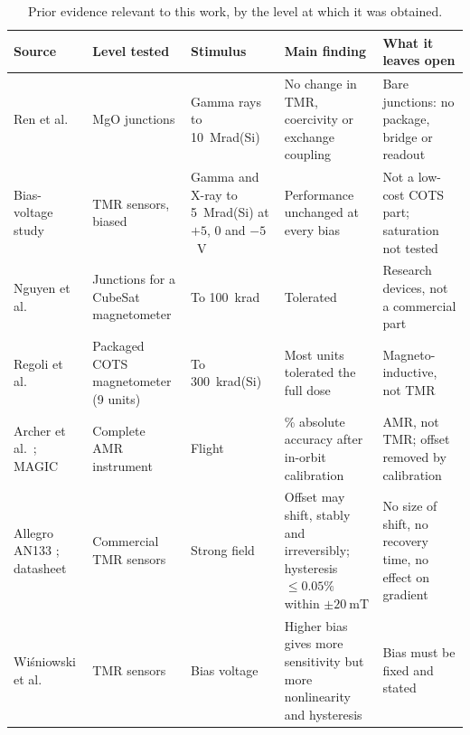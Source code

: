 \documentclass[12pt,a4paper]{article}
\begin{document}
\begin{table}[H]
\centering
\caption{Prior evidence relevant to this work, by the level at which it was obtained.}
\label{tab:lit-synthesis}
\small
\begin{tabular}{@{}>{\raggedright\arraybackslash}p{}>{\raggedright\arraybackslash}p{}>{\raggedright\arraybackslash}p{}>{\raggedright\arraybackslash}p{}>{\raggedright\arraybackslash}p{}@{}}
\toprule
Source & Level tested & Stimulus & Main finding & What it leaves open \\
\midrule
Ren et al.\ \cite{ren2012} & MgO junctions & Gamma rays to \SI{10}{\mega rad}(Si) & No change in TMR, coercivity or exchange coupling & Bare junctions: no package, bridge or readout \\
Bias-voltage study \cite{tmr-bias-radiation} & TMR sensors, biased & Gamma and X-ray to \SI{5}{\mega rad}(Si) at $+5$, 0 and $-5$~V & Performance unchanged at every bias & Not a low-cost COTS part; saturation not tested \\
Nguyen et al.\ \cite{nguyen2010} & Junctions for a CubeSat magnetometer & To \SI{100}{\kilo rad} & Tolerated & Research devices, not a commercial part \\
Regoli et al.\ \cite{regoli2020} & Packaged COTS magnetometer (9 units) & To \SI{300}{\kilo rad}(Si) & Most units tolerated the full dose & Magneto-inductive, not TMR \\
Archer et al.\ \cite{archer2015}; MAGIC \cite{magic-radcube} & Complete AMR instrument & Flight & 2\% absolute accuracy after in-orbit calibration & AMR, not TMR; offset removed by calibration \\
Allegro AN133 \cite{allegro_an133}; datasheet \cite{ct100_datasheet} & Commercial TMR sensors & Strong field & Offset may shift, stably and irreversibly; hysteresis $\le 0.05\%$ within $\pm\SI{20}{\milli\tesla}$ & No size of shift, no recovery time, no effect on gradient \\
Wi\'sniowski et al.\ \cite{wisniowski2021} & TMR sensors & Bias voltage & Higher bias gives more sensitivity but more nonlinearity and hysteresis & Bias must be fixed and stated \\
\bottomrule
\end{tabular}
\end{table}
\end{document}
